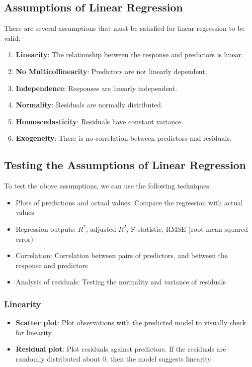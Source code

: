 \documentclass{article}
\begin{document}
\subsection{Assumptions of Linear Regression}
There are several assumptions that must be satisfied for linear
regression to be valid:
\begin{enumerate}
    \item \textbf{Linearity}: The relationship between the response and
          predictors is linear.
    \item \textbf{No Multicollinearity}: Predictors are not linearly
          dependent.
    \item \textbf{Independence}: Responses are linearly independent.
    \item \textbf{Normality}: Residuals are normally distributed.
    \item \textbf{Homoscedasticity}: Residuals have constant variance.
    \item \textbf{Exogeneity}: There is no correlation between
          predictors and residuals.
\end{enumerate}
\subsection{Testing the Assumptions of Linear Regression}
To test the above assumptions, we can use the following techniques:
\begin{itemize}
    \item Plots of predictions and actual values: Compare the
          regression with actual values
    \item Regression outputs: \(R^2\), adjusted \(R^2\), F-statistic,
          RMSE (root mean squared error)
    \item Correlation: Correlation between pairs of predictors, and
          between the response and predictors
    \item Analysis of residuals: Testing the normality and variance of
          residuals
\end{itemize}
\subsubsection{Linearity}
\begin{itemize}
    \item \textbf{Scatter plot}: Plot observations with the predicted
          model to visually check for linearity
    \item \textbf{Residual plot}: Plot residuals against predictors. If
          the residuals are randomly distributed about 0, then the model
          suggests linearity
\end{itemize}
\end{document}
